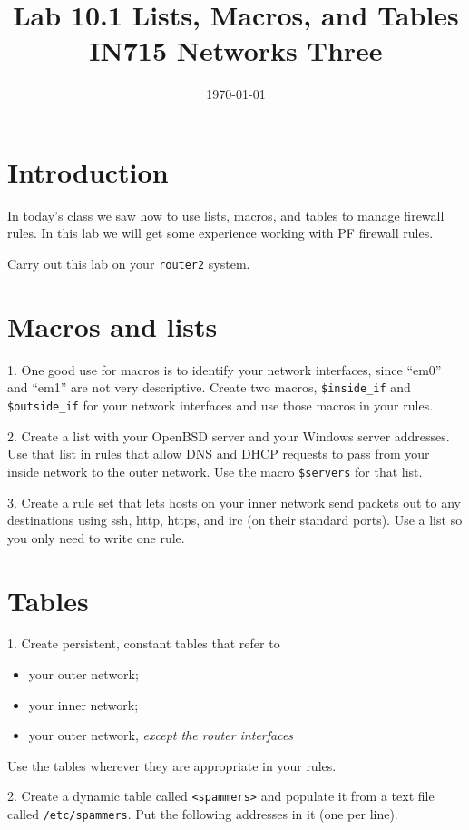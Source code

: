 \documentclass{article}
\begin{document}
\title{ Lab 10.1 Lists, Macros, and Tables\\ IN715 Networks Three}
\date{\today}
\maketitle

\section*{Introduction}
In today's class we saw how to use lists, macros, and tables to manage
firewall rules.  In this lab we will get some experience working with 
PF firewall rules.

Carry out this lab on your \texttt{router2} system.

\section{Macros and lists}
1.  One good use for macros is to identify your network interfaces, since ``em0'' and ``em1'' are not very descriptive.  Create two macros, \texttt{\$inside\_if} and \texttt{\$outside\_if} for your network interfaces and use those macros in your rules.

2.  Create a list with your OpenBSD server and your Windows server addresses.  Use that list in rules that allow DNS and DHCP requests to pass from your inside network to the outer network. Use the macro \texttt{\$servers} for that list.

3. Create a rule set that lets hosts on your inner network send packets out 
to any destinations using ssh, http, https, and irc (on their standard ports). Use a list so you only need to write one rule.

\section{Tables}

1. Create persistent, constant tables that refer to
\begin{itemize}
  \item your outer network;
  \item your inner network;
  \item your outer network, \emph{except the router interfaces}
\end{itemize}

Use the tables wherever they are appropriate in your rules.

2. Create a dynamic table called \texttt{<spammers>} and populate it from a text file called \texttt{/etc/spammers}. Put the following addresses in it (one per line).
\end{document}
